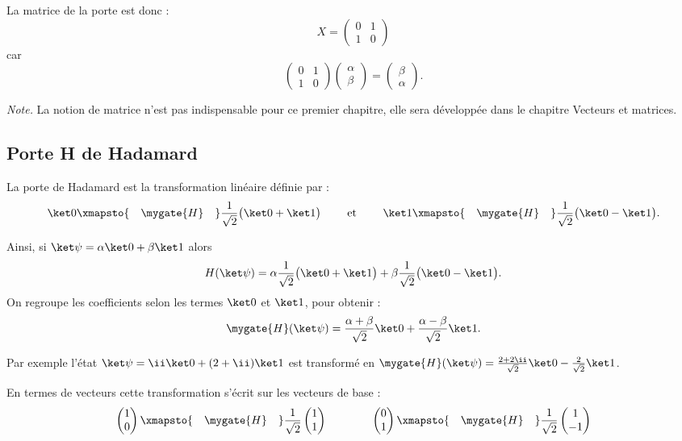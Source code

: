 \documentclass[11pt,class=report,crop=false]{standalone}
\begin{document}
La matrice de la porte  est donc :
$$X = \begin{pmatrix}0&1\\1&0\end{pmatrix}$$
car 
$$\begin{pmatrix}0&1\\1&0\end{pmatrix}
\begin{pmatrix}\alpha\\\beta\end{pmatrix}
= \begin{pmatrix}\beta\\\alpha\end{pmatrix}.$$


\emph{Note.} La notion de matrice n'est pas indispensable pour ce premier chapitre, elle sera développée dans le chapitre \og{}Vecteurs et matrices\fg{}.
 
\subsection{Porte H de Hadamard}

La porte  de Hadamard est la transformation linéaire définie par :
$$\ket 0 \xmapsto{\quad\mygate{H}\quad} \frac1{\sqrt2} \big(\ket0+\ket1\big) \qquad \text{ et } \qquad \ket 1 \xmapsto{\quad\mygate{H}\quad} \frac1{\sqrt2} \big(\ket0-\ket1\big).$$

Ainsi, si $\ket\psi = \alpha  \ket 0 + \beta \ket 1$
alors 
$$H(\ket\psi) 
= \alpha\frac1{\sqrt2} \big(\ket0+\ket1\big) + \beta\frac1{\sqrt2}\big(\ket0-\ket1\big).$$
On regroupe les coefficients selon les termes $\ket0$ et $\ket1$, pour obtenir :
$$\mygate{H}(\ket\psi) 
= \frac{\alpha+\beta}{\sqrt2} \ket0+  \frac{\alpha-\beta}{\sqrt2}\ket1.$$

Par exemple l'état $\ket \psi = \ii\ket0 + (2+\ii) \ket 1$ est transformé en
$\mygate{H}(\ket\psi) = \frac{2+2\ii}{\sqrt2}\ket0- \frac{2}{\sqrt2}\ket1$.



En termes de vecteurs cette transformation s'écrit sur les vecteurs de base :
$$\begin{pmatrix}1\\0\end{pmatrix} \xmapsto{\quad\mygate{H}\quad} \frac1{\sqrt2}\begin{pmatrix}1\\1\end{pmatrix}
\qquad\qquad \begin{pmatrix}0\\1\end{pmatrix} \xmapsto{\quad\mygate{H}\quad} \frac1{\sqrt2}\begin{pmatrix}1\\-1\end{pmatrix}$$
\end{document}
